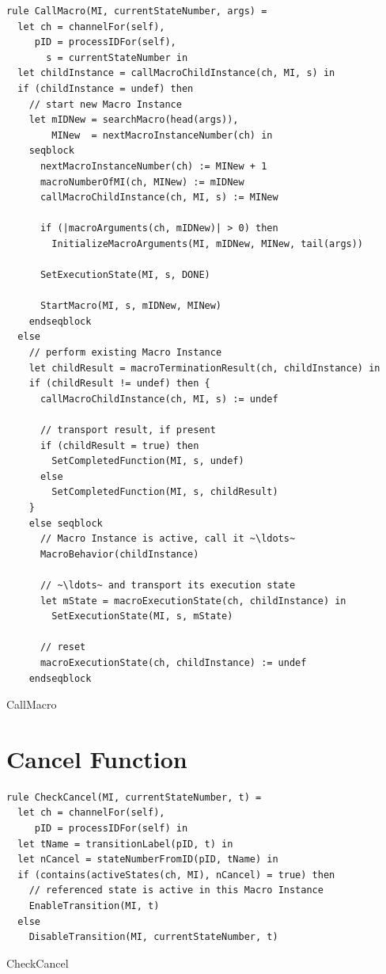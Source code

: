 \begin{listing}[H]
\begin{verbatim}
rule CallMacro(MI, currentStateNumber, args) =
  let ch = channelFor(self),
     pID = processIDFor(self),
       s = currentStateNumber in
  let childInstance = callMacroChildInstance(ch, MI, s) in
  if (childInstance = undef) then
    // start new Macro Instance
    let mIDNew = searchMacro(head(args)),
        MINew  = nextMacroInstanceNumber(ch) in
    seqblock
      nextMacroInstanceNumber(ch) := MINew + 1
      macroNumberOfMI(ch, MINew) := mIDNew
      callMacroChildInstance(ch, MI, s) := MINew

      if (|macroArguments(ch, mIDNew)| > 0) then
        InitializeMacroArguments(MI, mIDNew, MINew, tail(args))

      SetExecutionState(MI, s, DONE)

      StartMacro(MI, s, mIDNew, MINew)
    endseqblock
  else
    // perform existing Macro Instance
    let childResult = macroTerminationResult(ch, childInstance) in
    if (childResult != undef) then {
      callMacroChildInstance(ch, MI, s) := undef

      // transport result, if present
      if (childResult = true) then
        SetCompletedFunction(MI, s, undef)
      else
        SetCompletedFunction(MI, s, childResult)
    }
    else seqblock
      // Macro Instance is active, call it ~\ldots~
      MacroBehavior(childInstance)

      // ~\ldots~ and transport its execution state
      let mState = macroExecutionState(ch, childInstance) in
        SetExecutionState(MI, s, mState)

      // reset
      macroExecutionState(ch, childInstance) := undef
    endseqblock
\end{verbatim}
\caption{CallMacro}
\label{lst:asm:CallMacro}
\end{listing}


\section{Cancel Function}


\begin{listing}[H]
\begin{verbatim}
rule CheckCancel(MI, currentStateNumber, t) =
  let ch = channelFor(self),
     pID = processIDFor(self) in
  let tName = transitionLabel(pID, t) in
  let nCancel = stateNumberFromID(pID, tName) in
  if (contains(activeStates(ch, MI), nCancel) = true) then
    // referenced state is active in this Macro Instance
    EnableTransition(MI, t)
  else
    DisableTransition(MI, currentStateNumber, t)
\end{verbatim}
\caption{CheckCancel}
\label{lst:asm:CheckCancel}
\end{listing}




